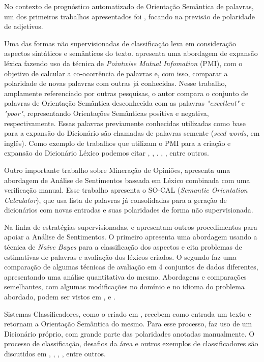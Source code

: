 \documentclass[12pt]{article}
\begin{document}
No contexto de prognóstico automatizado de Orientação Semântica de palavras, um dos primeiros trabalhos apresentados foi \cite{Hatzivassiloglou}, focando na previsão de polaridade de adjetivos.

Uma das formas não supervisionadas de classificação leva em consideração aspectos sintáticos e semânticos do texto. \cite{Turney2002} apresenta uma abordagem de expansão léxica fazendo uso da técnica de \emph{Pointwise Mutual Infomation} (PMI), com o objetivo de calcular a co-ocorrência de palavras e, com isso, comparar a polaridade de novas palavras com outras já conhecidas. Nesse trabalho, amplamente referenciado por outras pesquisas, o autor compara o conjunto de palavras de Orientação Semântica desconhecida com as palavras \emph{ "excellent"} e \emph{"poor"}, representando Orientações Semânticas positiva e negativa, respectivamente. Essas palavras previamente conhecidas utilizadas como base para a expansão do Dicionário são chamadas de palavras semente (\emph{seed words}, em inglês). Como exemplo de trabalhos que utilizam o PMI para a criação e expansão do Dicionário Léxico podemos citar \cite{becker2013}, \cite{Zhou2014}, \cite{Pinto2007}. \cite{Pantel2006}, \cite{duwairi2015detecting}, entre outros.

Outro importante trabalho sobre Mineração de Opiniões, \cite{taboada2011lexicon} apresenta uma abordagem de Análise de Sentimentos baseada em Léxico combinada com uma verificação manual. Esse trabalho apresenta o SO-CAL (\emph{Semantic Orientation Calculator}), que usa lista de palavras já consolidadas para a geração de dicionários com novas entradas e suas polaridades de forma não supervisionada.

Na linha de estratégias supervisionadas, \cite{eisenstein2016unsupervised} e \cite{bandhakavi2016lexicon} apresentam outros procedimentos para apoiar a Análise de Sentimentos. O primeiro apresenta uma abordagem usando a técnica de \emph{Naive Bayes} para a classificação dos aspectos e cita problemas de estimativas de palavras e avaliação dos léxicos criados. O segundo faz uma comparação de algumas técnicas de avaliação em 4 conjuntos de dados diferentes, apresentando uma análise quantitativa do mesmo. Abordagens e comparações semelhantes, com algumas modificações no domínio e no idioma do problema abordado, podem ser vistos em \cite{khoo2017lexicon}, \cite{asghar2014review} e \cite{ding2008holistic}.

Sistemas Classificadores, como o criado em \cite{Rodrigues2016}, recebem como entrada um texto e retornam a Orientação Semântica do mesmo. Para esse processo, \cite{Rodrigues2016} faz uso de um Dicionário próprio, com grande parte das polaridades anotadas manualmente. O processo de classificação, desafios da área e outros exemplos de classificadores são discutidos em \cite{Pang2002}, \cite{Zhou2014}, \cite{silva2010automatic}, \cite{kdir16}, entre outros.
\end{document}
